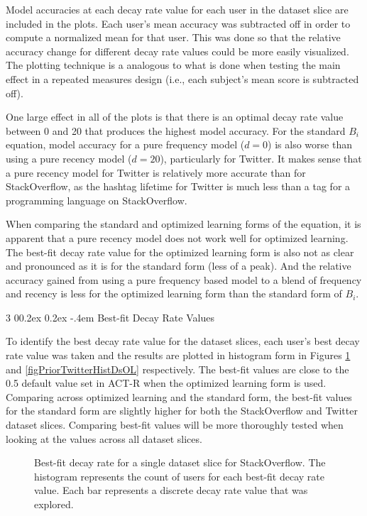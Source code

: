 \documentclass[man,floatsintext,donotrepeattitle]{apa6}
\makeatletter
\renewcommand{\subsubsection}{%
  \@startsection
  {subsubsection}%
  {3}%
  {\parindent}%
  {0\baselineskip \@plus 0.2ex \@minus 0.2ex}%
  {-.4em}%
  {\normalfont\normalsize\bfseries\addperi}}
\makeatother
\begin{document}
Model accuracies at each decay rate value for each user in the dataset slice are included in the plots.
Each user's mean accuracy was subtracted off in order to compute a normalized mean for that user.
This was done so that the relative accuracy change for different decay rate values could be more easily visualized.
The plotting technique is a analogous to what is done when testing the main effect in a repeated measures design (i.e., each subject's mean score is subtracted off).

One large effect in all of the plots is that there is an optimal decay rate value between 0 and 20 that produces the highest model accuracy.
For the standard $B_{i}$ equation, model accuracy for a pure frequency model ($d=0$) is also worse than using a pure recency model ($d=20$), particularly for Twitter.
It makes sense that a pure recency model for Twitter is relatively more accurate than for StackOverflow, as the hashtag lifetime for Twitter is much less than a tag for a programming language on StackOverflow.

When comparing the standard and optimized learning forms of the equation, it is apparent that a pure recency model does not work well for optimized learning.
The best-fit decay rate value for the optimized learning form is also not as clear and pronounced as it is for the standard form (less of a peak).
And the relative accuracy gained from using a pure frequency based model to a blend of frequency and recency is less for the optimized learning form than the standard form of $B_{i}$.

\subsubsection{Best-fit Decay Rate Values}

To identify the best decay rate value for the dataset slices,
each user's best decay rate value was taken and the results are plotted in histogram form in Figures \ref{figPriorSOQHistDsOL} and \ref{figPriorTwitterHistDsOL} respectively.
The best-fit values are close to the \num{0.5} default value set in ACT-R when the optimized learning form is used.
Comparing across optimized learning and the standard form, the best-fit values for the standard form are slightly higher for both the StackOverflow and Twitter dataset slices.
Comparing best-fit values will be more thoroughly tested when looking at the values across all dataset slices.

\begin{figure}[!htbp]
  {%
    \setlength{\fboxsep}{0pt}%
    \setlength{\fboxrule}{1pt}%
    \hfill
    \hfill
    \caption{
      Best-fit decay rate for a single dataset slice for StackOverflow.
      The histogram represents the count of users for each best-fit decay rate value.
      Each bar represents a discrete decay rate value that was explored.
  }
    \label{figPriorSOQHistDsOL}
  }%
\end{figure}
\end{document}
